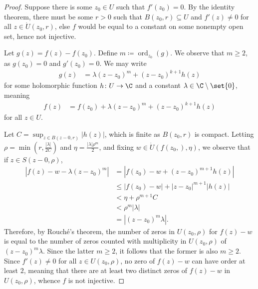 \documentclass[10pt]{mypackage}
\renewcommand{\coloneq}{\coloneqq}
\begin{document}
\begin{proof}
  Suppose there is some $z_0\in U$ such that $f'\left(z_0\right)= 0$. By the identity theorem, there must be some $r > 0$ such that $B\left( z_0,r \right) \subseteq U$ and $f'(z)\neq 0$ for all $z\in \dot{U}\left( z_0,r \right)$, else $f$ would be equal to a constant on some nonempty open set, hence not injective.%

  Let $g(z) = f(z) - f\left( z_0 \right)$. Define $m\coloneq \operatorname{ord}_{z_0}(g)$. We observe that $m\geq 2$, as $g\left( z_0 \right) = 0$ and $g'\left( z_0 \right) = 0$. We may write
  \begin{align*}
    g(z) &= \lambda \left( z-z_0 \right)^{m} + \left( z-z_0 \right)^{k+1}h(z)
  \end{align*}
  for some holomorphic function $h\colon U\rightarrow \C$ and a constant $\lambda\in \C\setminus \set{0}$, meaning
  \begin{align*}
    f(z) &= f\left( z_0 \right) + \lambda \left( z-z_0 \right)^{m} + \left( z-z_0 \right)^{k+1}h(z)
  \end{align*}
  for all $z\in U$.%

  Let $C = \sup_{z\in B\left( z-0,r \right)}\left\vert h(z) \right\vert$, which is finite as $B\left( z_0,r \right)$ is compact. Letting $\rho = \min\left( r,\frac{\left\vert \lambda \right\vert}{2C} \right)$ and $\eta = \frac{\left\vert \lambda \right\vert \rho^{m}}{2}$, and fixing $w\in \dot{U}\left( f\left( z_0, \right),\eta \right)$, we observe that if $z\in S\left( z-0,\rho \right)$,
  \begin{align*}
    \left\vert f(z) - w - \lambda \left( z-z_0 \right)^{m} \right\vert &= \left\vert f\left( z_0 \right) - w + \left( z-z_0 \right)^{m+1}h(z) \right\vert\\
                                                                       &\leq \left\vert f\left( z_0 \right) - w \right\vert + \left\vert z-z_0 \right\vert^{m+1} \left\vert h(z) \right\vert\\
                                                                       &< \eta + \rho^{m+1}C\\
                                                                       &< \rho^{m} \left\vert \lambda \right\vert\\
                                                                       &= \left\vert \left( z-z_0 \right)^{m}\lambda \right\vert.
  \end{align*}
  Therefore, by Rouché's theorem, the number of zeros in $U\left( z_0,\rho \right)$ for $f(z) - w$ is equal to the number of zeros counted with multiplicity in $U\left( z_0,\rho \right)$ of $\left( z-z_0 \right)^{m}\lambda$. Since the latter $m\geq 2$, it follows that the former is also $m\geq 2$. Since $f'(z)\neq 0$ for all $z\in U\left( z_0,\rho \right)$, no zero of $f(z) - w$ can have order at least $2$, meaning that there are at least two distinct zeros of $f(z) - w$ in $U\left( z_0,\rho \right)$, whence $f$ is not injective.
\end{proof}
\end{document}
